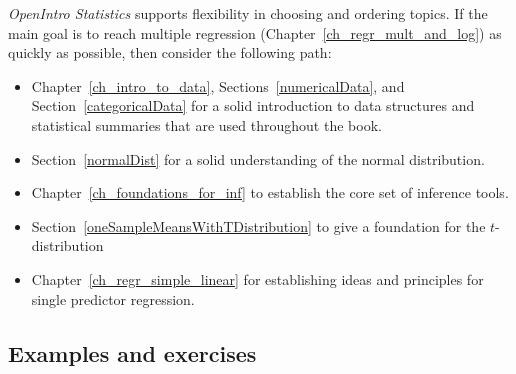 \noindent%
\emph{OpenIntro Statistics} supports flexibility
in choosing and ordering topics.
If the main goal is to reach multiple regression
(Chapter~\ref{ch_regr_mult_and_log})
as quickly as possible, then consider the
following path:
\begin{itemize}
\item Chapter~\ref{ch_intro_to_data},
    Sections~\ref{numericalData},
    and Section~\ref{categoricalData} for a solid
    introduction to data structures and statistical
    summaries that are used throughout the book.
\item Section~\ref{normalDist}
    for a solid understanding of the normal distribution.
\item Chapter~\ref{ch_foundations_for_inf}
    to establish the core set of inference tools.
%    
%    
\item Section~\ref{oneSampleMeansWithTDistribution}
    to give a foundation for the $t$-distribution
\item Chapter~\ref{ch_regr_simple_linear}
    for establishing ideas and principles for single
    predictor regression.
\end{itemize}


\subsection*{Examples and exercises}

